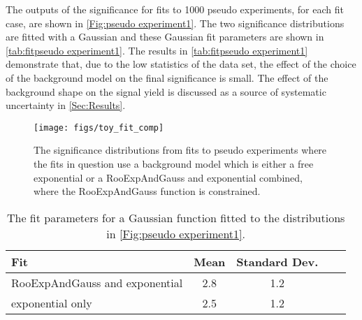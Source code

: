 The outputs of the significance for fits to 1000 pseudo experiments, for each fit case, are shown in \autoref{Fig:pseudo experiment1}. The two significance distributions are fitted with a Gaussian and these Gaussian fit parameters are shown in \autoref{tab:fitpseudo experiment1}. The results in \autoref{tab:fitpseudo experiment1} demonstrate that, due to the low statistics of the data set, the effect of the choice of the background model on the final significance is small. The effect of the background shape on the signal yield is discussed as a source of systematic uncertainty in \autoref{Sec:Results}.

\begin{figure}[!t]
  \centering
  \texttt{[image: figs/toy\_fit\_comp]}
  \caption{The significance distributions from fits to pseudo experiments where the fits in question use a background model which is either a free exponential or a RooExpAndGauss and exponential combined, where the RooExpAndGauss function is constrained.}
  \label{Fig:pseudo experiment1}
\end{figure}

\begin{table}[!h]
  \centering

  \begin{tabular}{l c c c c}
    \hline
    Fit& Mean& Standard Dev.\\
    \hline
    RooExpAndGauss and exponential & 2.8&1.2\\
    exponential only  & 2.5&1.2\\
    \hline
  \end{tabular}
  \caption{The fit parameters for a Gaussian function fitted to the distributions in \autoref{Fig:pseudo experiment1}.}%
  \label{tab:fitpseudo experiment1}
\end{table}


